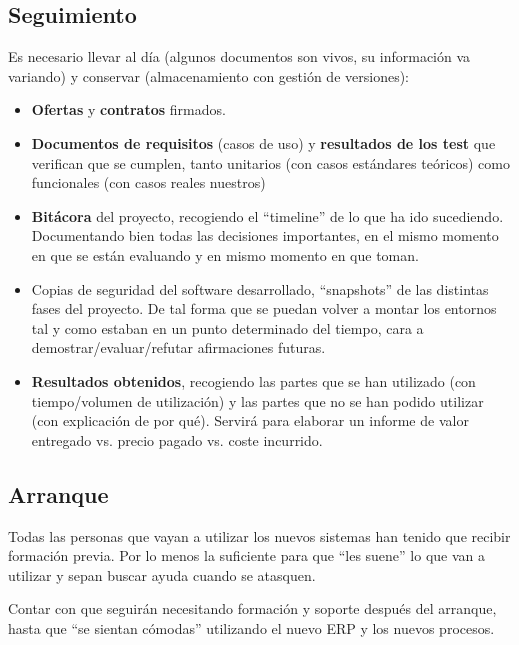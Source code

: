 \documentclass[spanish,12pt,a4paper,final,oneside]{article}
\begin{document}
\subsection{Seguimiento}
Es necesario llevar al día (algunos documentos son vivos, su información va variando) y conservar (almacenamiento con gestión de versiones):
\begin{itemize}

\item \textbf{Ofertas} y \textbf{contratos} firmados.

\item \textbf{Documentos de requisitos} (casos de uso) y \textbf{resultados de los test} que verifican que se cumplen, tanto unitarios (con casos estándares teóricos) como funcionales (con casos reales nuestros)

\item \textbf{Bitácora} del proyecto, recogiendo el ``timeline'' de lo que ha ido sucediendo. Documentando bien todas las decisiones importantes, en el mismo momento en que se están evaluando y en mismo momento en que toman.

\item Copias de seguridad del software desarrollado, ``snapshots'' de las distintas fases del proyecto. De tal forma que se puedan volver a montar los entornos tal y como estaban en un punto determinado del tiempo, cara a demostrar/evaluar/refutar afirmaciones futuras.

\item \textbf{Resultados obtenidos}, recogiendo las partes que se han utilizado (con tiempo/volumen de utilización) y las partes que no se han podido utilizar (con explicación de por qué). Servirá para elaborar un informe de valor entregado vs. precio pagado vs. coste incurrido.

\end{itemize}


\subsection{Arranque}
Todas las personas que vayan a utilizar los nuevos sistemas han tenido que recibir formación previa. Por lo menos la suficiente para que ``les suene'' lo que van a utilizar y sepan buscar ayuda cuando se atasquen.

Contar con que seguirán necesitando formación y soporte después del arranque, hasta que ``se sientan cómodas'' utilizando el nuevo ERP y los nuevos procesos.
\end{document}
